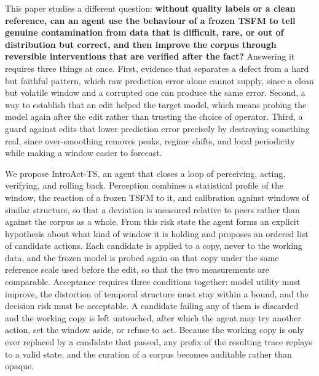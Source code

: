 \documentclass{article}
\begin{document}
This paper studies a different question: \textbf{without quality labels or a clean reference, can an agent use the behaviour of a frozen TSFM to tell genuine contamination from data that is difficult, rare, or out of distribution but correct, and then improve the corpus through reversible interventions that are verified after the fact?} Answering it requires three things at once. First, evidence that separates a defect from a hard but faithful pattern, which raw prediction error alone cannot supply, since a clean but volatile window and a corrupted one can produce the same error. Second, a way to establish that an edit helped the target model, which means probing the model again after the edit rather than trusting the choice of operator. Third, a guard against edits that lower prediction error precisely by destroying something real, since over-smoothing removes peaks, regime shifts, and local periodicity while making a window easier to forecast.

We propose IntroAct-TS, an agent that closes a loop of perceiving, acting, verifying, and rolling back. Perception combines a statistical profile of the window, the reaction of a frozen TSFM to it, and calibration against windows of similar structure, so that a deviation is measured relative to peers rather than against the corpus as a whole. From this risk state the agent forms an explicit hypothesis about what kind of window it is holding and proposes an ordered list of candidate actions. Each candidate is applied to a copy, never to the working data, and the frozen model is probed again on that copy under the same reference scale used before the edit, so that the two measurements are comparable. Acceptance requires three conditions together: model utility must improve, the distortion of temporal structure must stay within a bound, and the decision risk must be acceptable. A candidate failing any of them is discarded and the working copy is left untouched, after which the agent may try another action, set the window aside, or refuse to act. Because the working copy is only ever replaced by a candidate that passed, any prefix of the resulting trace replays to a valid state, and the curation of a corpus becomes auditable rather than opaque.
\end{document}
